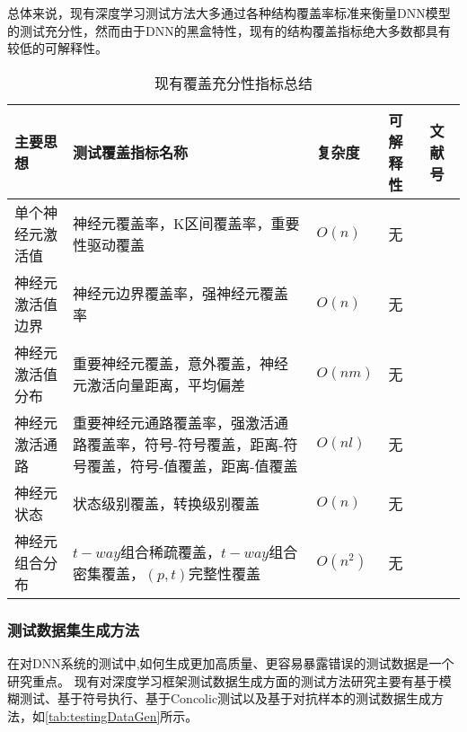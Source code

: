 总体来说，现有深度学习测试方法大多通过各种结构覆盖率标准来衡量DNN模型的测试充分性，然而由于DNN的黑盒特性，现有的结构覆盖指标绝大多数都具有较低的可解释性。


\begin{table}[t]
	\small
	\centering
	\caption{现有覆盖充分性指标总结}
	\label{tab:coverage_criteria}
	\begin{tabular}{p{4cm}p{6cm}p{1cm}p{1cm}p{2cm}}
		\toprule
		\textbf{主要思想}\centering & \textbf{测试覆盖指标名称}\centering & \textbf{复杂度} & \textbf{可解释性} & \textbf{文献号} \\
		\midrule
		单个神经元激活值\centering & 神经元覆盖率，K区间覆盖率，重要性驱动覆盖\centering & $O(n)$ & 无 & \cite{ma2018deepgauge,Pei2019DeepXplore,Gerasimou2020Importance} \\
		神经元激活值边界\centering & 神经元边界覆盖率，强神经元覆盖率\centering & $O(n)$ & 无 & \cite{ma2018deepgauge} \\
		神经元激活值分布\centering & 重要神经元覆盖，意外覆盖，神经元激活向量距离，平均偏差\centering & $O(nm)$ & 无 & \cite{ma2018deepgauge,Kim2019Guiding,Tian2019Testing} \\
		神经元激活通路\centering & 重要神经元通路覆盖率，强激活通路覆盖率，符号-符号覆盖，距离-符号覆盖，符号-值覆盖，距离-值覆盖\centering & $O(nl)$ & 无 & \cite{ma2018deepgauge,Wang2019DeepPath,Sun2018Testing} \\
		神经元状态\centering & 状态级别覆盖，转换级别覆盖\centering & $O(n)$ & 无 & \cite{Du2018DeepCruiser} \\
		神经元组合分布\centering & $t-way$组合稀疏覆盖，$t-way$组合密集覆盖，$(p,t)$完整性覆盖\centering & $O(n^2)$ & 无 & \cite{ma2019deepct} \\
		\bottomrule
	\end{tabular}
\end{table}




\subsubsection{测试数据集生成方法}


在对DNN系统的测试中,如何生成更加高质量、更容易暴露错误的测试数据是一个研究重点。
现有对深度学习框架测试数据生成方面的测试方法研究主要有基于模糊测试、基于符号执行、基于Concolic测试以及基于对抗样本的测试数据生成方法，如\cref{tab:testingDataGen}所示。

